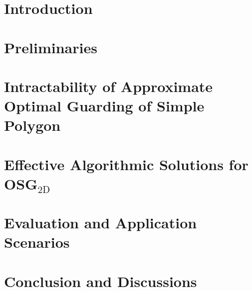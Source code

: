 \documentclass[letterpaper, 10 pt, conference]{formatting/ieeeconf}
\theoremstyle{definition}
\theoremstyle{remark}
\def\osgt{\textsc{OSG${}_{\mathrm{2D}}$}\xspace}
\begin{document}
\section{Introduction}\label{sec:intro}


\section{Preliminaries}\label{sec:problem}


\section{Intractability of Approximate Optimal Guarding of Simple Polygon}\label{sec:complexity}


\section{Effective Algorithmic Solutions for \osgt}\label{sec:algo}


\section{Evaluation and Application Scenarios}\label{sec:expr}


\section{Conclusion and Discussions}\label{sec:conc}



 
\end{document}

